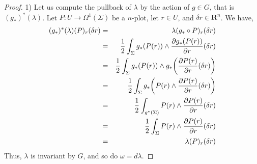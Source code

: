 \documentclass[10pt,reqno,twoside]{amsart}
\newcommand{\RR}{\mathbf{R}}
\newcommand{\undemi}{\frac{1}{2}}
\theoremstyle{plain}
\theoremstyle{definition}
\begin{document}
  \begin{proof}
    1) Let us compute the pullback of $\lambda$ by the action of $g \in G$,
    that is $(g_*)^*(\lambda)$.
    Let $P : U \to \Omega^1(\Sigma)$ be a $n$-plot,
    let $r \in U$,
    and $\delta r \in \RR^n$.
    We have,
    \begin{eqnarray*} (g_*)^*(\lambda)(P)_r(\delta r) & = & \lambda(g_* \circ P)_r(\delta r) \\
      & = & \undemi \int_\Sigma g_*(P (r)) \wedge {\partial g_*(P (r)) \over \partial r}(\delta r)\\
      & = & \undemi \int_\Sigma g_*(P (r)) \wedge g_*\bigg({\partial P (r) \over \partial r}(\delta r)\bigg) \\
      & = & \undemi \int_\Sigma g_*\bigg(P (r)\wedge {\partial P (r) \over \partial r}(\delta r)\bigg) \\
      & = & \undemi \int_{g^*(\Sigma)} P (r)\wedge {\partial P (r) \over \partial r}(\delta r) \\
      & = & \undemi \int_\Sigma P (r)\wedge {\partial P (r) \over \partial r}(\delta r) \\
      & = & \lambda (P)_r(\delta r)
    \end{eqnarray*}
    Thus,
    $\lambda$ is invariant by $G$,
    and so do $\omega = d\lambda$.
    

\end{proof}
\end{document}
